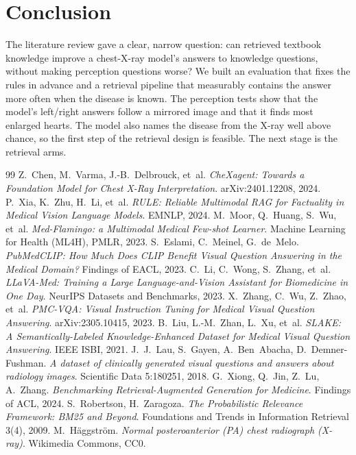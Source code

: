 \documentclass[11pt,a4paper]{article}
\begin{document}
\section{Conclusion}
The literature review gave a clear, narrow question: can retrieved textbook knowledge improve a chest-X-ray model's answers
to knowledge questions, without making perception questions worse? We built an evaluation that fixes the rules in advance and
a retrieval pipeline that measurably contains the answer more often when the disease is known.
The perception tests show that the model's left/right answers follow a mirrored image and that it finds most enlarged hearts.
The model also names the disease from the X-ray well above chance, so the first step of the retrieval design is feasible.
The next stage is the retrieval arms.

\begin{thebibliography}{99}\small
\setlength{\itemsep}{0.2em}
 Z.~Chen, M.~Varma, J.-B.~Delbrouck, et~al. \emph{CheXagent: Towards a Foundation Model for Chest X-Ray Interpretation}. arXiv:2401.12208, 2024.
 P.~Xia, K.~Zhu, H.~Li, et~al. \emph{RULE: Reliable Multimodal RAG for Factuality in Medical Vision Language Models}. EMNLP, 2024.
 M.~Moor, Q.~Huang, S.~Wu, et~al. \emph{Med-Flamingo: a Multimodal Medical Few-shot Learner}. Machine Learning for Health (ML4H), PMLR, 2023.
 S.~Eslami, C.~Meinel, G.~de~Melo. \emph{PubMedCLIP: How Much Does CLIP Benefit Visual Question Answering in the Medical Domain?} Findings of EACL, 2023.
 C.~Li, C.~Wong, S.~Zhang, et~al. \emph{LLaVA-Med: Training a Large Language-and-Vision Assistant for Biomedicine in One Day}. NeurIPS Datasets and Benchmarks, 2023.
 X.~Zhang, C.~Wu, Z.~Zhao, et~al. \emph{PMC-VQA: Visual Instruction Tuning for Medical Visual Question Answering}. arXiv:2305.10415, 2023.
 B.~Liu, L.-M.~Zhan, L.~Xu, et~al. \emph{SLAKE: A Semantically-Labeled Knowledge-Enhanced Dataset for Medical Visual Question Answering}. IEEE ISBI, 2021.
 J.~J.~Lau, S.~Gayen, A.~Ben~Abacha, D.~Demner-Fushman. \emph{A dataset of clinically generated visual questions and answers about radiology images}. Scientific Data 5:180251, 2018.
 G.~Xiong, Q.~Jin, Z.~Lu, A.~Zhang. \emph{Benchmarking Retrieval-Augmented Generation for Medicine}. Findings of ACL, 2024.
 S.~Robertson, H.~Zaragoza. \emph{The Probabilistic Relevance Framework: BM25 and Beyond}. Foundations and Trends in Information Retrieval 3(4), 2009.
 M.~H\"aggstr\"om. \emph{Normal posteroanterior (PA) chest radiograph (X-ray)}. Wikimedia Commons, CC0.
\end{thebibliography}
\end{document}
